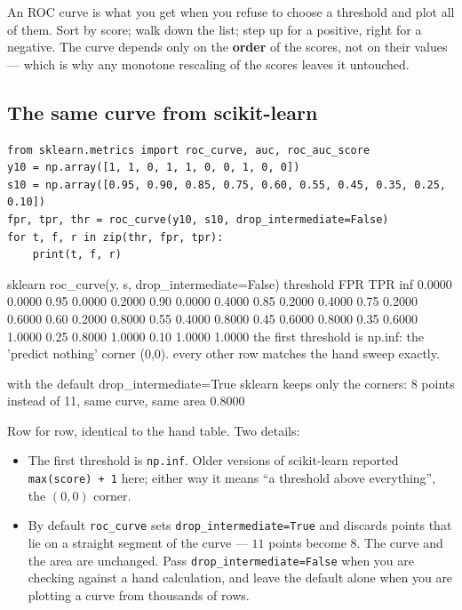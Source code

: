 \documentclass[11pt]{article}
\begin{document}
\begin{keyidea}
An ROC curve is what you get when you refuse to choose a threshold and plot all
of them. Sort by score; walk down the list; step up for a positive, right for a
negative. The curve depends only on the \textbf{order} of the scores, not on
their values --- which is why any monotone rescaling of the scores leaves it
untouched.
\end{keyidea}

\subsection{The same curve from scikit-learn}

\begin{lstlisting}
from sklearn.metrics import roc_curve, auc, roc_auc_score
y10 = np.array([1, 1, 0, 1, 1, 0, 0, 1, 0, 0])
s10 = np.array([0.95, 0.90, 0.85, 0.75, 0.60, 0.55, 0.45, 0.35, 0.25, 0.10])
fpr, tpr, thr = roc_curve(y10, s10, drop_intermediate=False)
for t, f, r in zip(thr, fpr, tpr):
    print(t, f, r)
\end{lstlisting}
\begin{codeout}
sklearn roc_curve(y, s, drop_intermediate=False)
 threshold      FPR     TPR
       inf  0.0000  0.0000
      0.95  0.0000  0.2000
      0.90  0.0000  0.4000
      0.85  0.2000  0.4000
      0.75  0.2000  0.6000
      0.60  0.2000  0.8000
      0.55  0.4000  0.8000
      0.45  0.6000  0.8000
      0.35  0.6000  1.0000
      0.25  0.8000  1.0000
      0.10  1.0000  1.0000
the first threshold is np.inf: the 'predict nothing' corner (0,0).
every other row matches the hand sweep exactly.

with the default drop_intermediate=True sklearn keeps only the corners:
  8 points instead of 11, same curve, same area 0.8000
\end{codeout}

Row for row, identical to the hand table. Two details:

\begin{itemize}[leftmargin=*]
  \item The first threshold is \texttt{np.inf}. Older versions of scikit-learn
    reported \texttt{max(score) + 1} here; either way it means ``a threshold
    above everything'', the $(0,0)$ corner.
  \item By default \texttt{roc\_curve} sets \texttt{drop\_intermediate=True} and
    discards points that lie on a straight segment of the curve --- $11$ points
    become $8$. The curve and the area are unchanged. Pass
    \texttt{drop\_intermediate=False} when you are checking against a hand
    calculation, and leave the default alone when you are plotting a curve from
    thousands of rows.
\end{itemize}
\end{document}
